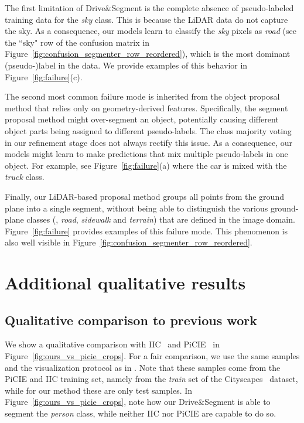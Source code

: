 \documentclass[runningheads]{llncs}
\newcommand{\ours}{Drive$\&$Segment\xspace}
\begin{document}
The first limitation of \ours is the complete absence of pseudo-labeled training data for the \emph{sky} class.
This is because 
the LiDAR data do not capture the sky.
As a consequence, our models learn to classify the \emph{sky} pixels as \emph{road} (see the ``sky" row of the confusion matrix in Figure~\ref{fig:confusion_segmenter_row_reordered}),
which is the most dominant (pseudo-)label in the data.
We provide examples of this behavior in  Figure~\ref{fig:failure}(c).

The second most common failure mode is inherited from the object proposal method that relies only on geometry-derived features. 
Specifically, the segment proposal method might over-segment an object, 
potentially causing different object parts being assigned to different pseudo-labels.
The class majority voting in our refinement stage does not always rectify this issue.
As a consequence, our models might learn to make predictions that mix multiple pseudo-labels in one object. 
For example, see Figure~\ref{fig:failure}(a) where the car is mixed with the \emph{truck} class.


Finally, our LiDAR-based proposal method groups all points from the ground plane into a single segment, without being able to distinguish the various ground-plane classes (\eg, \textit{road}, \textit{sidewalk} and \textit{terrain}) that are defined in the image domain. Figure~\ref{fig:failure} provides examples of this failure mode. This phenomenon is also well visible in Figure~\ref{fig:confusion_segmenter_row_reordered}.







\section{Additional qualitative results}

\subsection{Qualitative comparison to previous work}
\label{sec:qual}
We show a qualitative comparison with IIC~\cite{ji2019invariant} and PiCIE~\cite{cho2021picie} in Figure~\ref{fig:ours_vs_picie_crops}. 
For a fair comparison, we 
use the same samples and the visualization protocol as in \cite{cho2021picie}. 
Note that these samples come from the PiCIE and IIC training set, namely from the \emph{train} set of the Cityscapes~\cite{Cordts2016Cityscapes} dataset, while for our method these are only test samples. In Figure~\ref{fig:ours_vs_picie_crops}, note how our \ours is able to segment the \emph{person} class, while neither IIC nor PiCIE are capable to do so.
\end{document}
